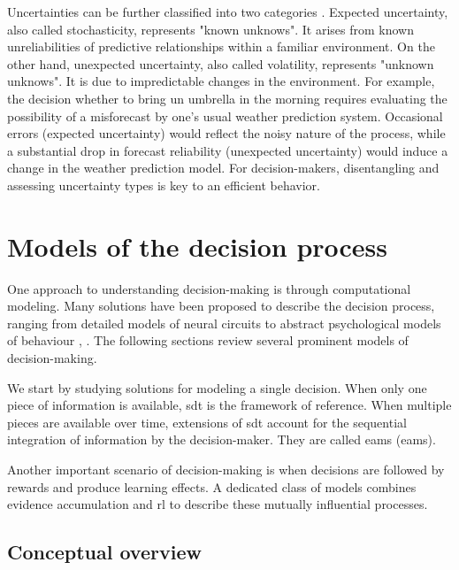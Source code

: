 Uncertainties can be further classified into two categories \cite{yuUncertaintyNeuromodulationAttention2005}. Expected uncertainty, also called stochasticity, represents "known unknows". It arises from known unreliabilities of predictive relationships within a familiar environment. On the other hand, unexpected uncertainty, also called volatility, represents "unknown unknows". It is due to impredictable changes in the environment. For example, the decision whether to bring un umbrella in the morning requires evaluating the possibility of a misforecast by one's usual weather prediction system. Occasional errors (expected uncertainty) would reflect the noisy nature of the process, while a substantial drop in forecast reliability (unexpected uncertainty) would induce a change in the weather prediction model. For decision-makers, disentangling and assessing uncertainty types is key to an efficient behavior. 

\section{Models of the decision process}

One approach to understanding decision-making is through computational modeling. Many solutions have been proposed to describe the decision process, ranging from detailed models of neural circuits to abstract psychological models of behaviour \cite{bogaczOptimalDecisionmakingTheories2007}, \cite{teodorescuDisentanglingDecisionModels2013}. The following sections review several prominent models of decision-making.

We start by studying solutions for modeling a single decision. When only one piece of information is available, \acrfull{sdt} is the framework of reference. When multiple pieces are available over time, extensions of \acrshort{sdt} account for the sequential integration of information by the decision-maker. They are called \acrlong{eam}s (\acrshort{eam}s).

Another important scenario of decision-making is when decisions are followed by rewards and produce learning effects. A dedicated class of models combines evidence accumulation and \acrfull{rl} to describe these mutually influential processes.

\subsection{Conceptual overview}

